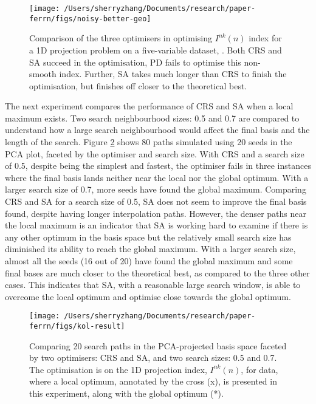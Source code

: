 \begin{Schunk}
\begin{figure}

{\centering \texttt{[image: /Users/sherryzhang/Documents/research/paper-ferrn/figs/noisy-better-geo]} 

}

\caption[Comparison of the three optimisers in optimising $I^{nk}(n)$ index for a 1D projection problem on a five-variable dataset, ]{Comparison of the three optimisers in optimising $I^{nk}(n)$ index for a 1D projection problem on a five-variable dataset, . Both CRS and SA succeed in the optimisation, PD fails to optimise this non-smooth index. Further, SA takes  much longer than CRS to finish the optimisation, but finishes off closer to the theoretical best.}\label{fig:noisy-better-geo}
\end{figure}
\end{Schunk}

The next experiment compares the performance of CRS and SA when a local
maximum exists. Two search neighbourhood sizes: 0.5 and 0.7 are compared
to understand how a large search neighbourhood would affect the final
basis and the length of the search. Figure \ref{fig:kol-result} shows 80
paths simulated using 20 seeds in the PCA plot, faceted by the optimiser
and search size. With CRS and a search size of 0.5, despite being the
simplest and fastest, the optimiser fails in three instances where the
final basis lands neither near the local nor the global optimum. With a
larger search size of 0.7, more seeds have found the global maximum.
Comparing CRS and SA for a search size of 0.5, SA does not seem to
improve the final basis found, despite having longer interpolation
paths. However, the denser paths near the local maximum is an indicator
that SA is working hard to examine if there is any other optimum in the
basis space but the relatively small search size has diminished its
ability to reach the global maximum. With a larger search size, almost
all the seeds (16 out of 20) have found the global maximum and some
final bases are much closer to the theoretical best, as compared to the
three other cases. This indicates that SA, with a reasonable large
search window, is able to overcome the local optimum and optimise close
towards the global optimum.

\begin{Schunk}
\begin{figure}

{\centering \texttt{[image: /Users/sherryzhang/Documents/research/paper-ferrn/figs/kol-result]} 

}

\caption[Comparing 20 search paths in the PCA-projected basis space faceted by two optimisers]{Comparing 20 search paths in the PCA-projected basis space faceted by two optimisers: CRS and SA, and two search sizes: 0.5 and 0.7. The optimisation is on the 1D projection index, $I^{nk}(n)$, for  data, where a local optimum, annotated by the cross (x), is presented in this experiment, along with the global optimum (*).}\label{fig:kol-result}
\end{figure}
\end{Schunk}

